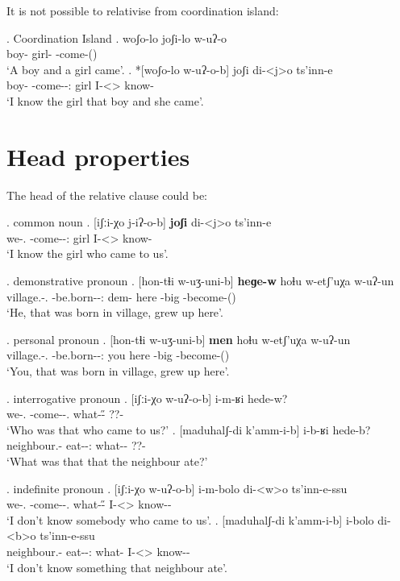 It is not possible to relativise from coordination island:

\ex. Coordination Island
	\ag. woʃo-lo joʃi-lo w-uʔ-o\\
			{boy-\Addi} {girl-\Addi} {\M-come-\Pst(\Aor)}\\
			\glt `A boy and a girl came'.	
	\bg. *[woʃo-lo w-uʔ-o-b] joʃi di-<j>o ts'inn-e\\
			{boy-\Addi} {\M-come-\Pst-\Ptcp:\Pst} girl {I-<\F>\Aff} {know-\Hab}\\
			\glt `I know the girl that boy and she came'.

\section{Head properties}
The head of the relative clause could be:

\ex. common noun
	\ag. [iʃːi-χo j-iʔ-o-b] \textbf{joʃi} di-<j>o ts'inn-e \\
		  {we-\Add.\Lat} {\F-come-\Pst-\Ptcp:\Pst} {girl} {I-<\F>\Aff} {know-\Hab}\\
		 \glt    `I know the girl who came to us'.

\ex. demonstrative pronoun
	\ag. [hon-tɬi w-uʒ-uni-b] \textbf{heɡe-w} hoɬu w-etʃ'uχa w-uʔ-un\\
			{village.\Obl-\Inter.\Ess} {\M-be.born-\Pst-\Ptcp:\Pst} {dem-\M} here {\M-big} {\M-become-\Pst(\Aor)}\\
			\glt `He, that was born in village, grew up here'.

\ex. personal pronoun
	\ag. [hon-tɬi w-uʒ-uni-b] \textbf{men} hoɬu w-etʃ'uχa w-uʔ-un\\
			{village.\Obl-\Inter.\Ess} {\M-be.born-\Pst-\Ptcp:\Pst} you here {\M-big} {\M-become-\Pst(\Aor)}\\
			\glt `You, that was born in village, grew up here'.
			
\ex. interrogative pronoun
	\ag. [iʃːi-χo w-uʔ-o-b] i-m-ʁi hede-w?\\
			{we-\Add.\Lat} {\M-come-\Pst-\Ptcp.\Pst} {what-\H-\Wh} {??-\M}\\
			\glt `Who was that who came to us?'
	\bg. [maduhalʃ-di k'amm-i-b] i-b-ʁi hede-b?\\
			{neighbour.\Obl-\Erg} {eat-\Pst-\Ptcp:\Pst} {what-\Nh-\Wh} {??-\Nanf}\\
			\glt `What was that that the neighbour ate?'
		
\ex. indefinite pronoun
	\ag.  [iʃːi-χo w-uʔ-o-b] i-m-bolo di-<w>o  ts'inn-e-ssu\\
			{we-\Add.\Lat} {\M-come-\Pst-\Ptcp.\Pst} {what-\H-\Indef} {I-<\M>\Aff} {know-\Hab-\Neg}\\
			\glt `I don't know somebody who came to us'.
	\bg.  [maduhalʃ-di k'amm-i-b] i-bolo di-<b>o  ts'inn-e-ssu\\
			{neighbour.\Obl-\Erg} {eat-\Pst-\Ptcp:\Pst} {what-\Indef} {I-<\Nanf>\Aff} {know-\Hab-\Neg}\\
			\glt `I don't know something that neighbour ate'.

